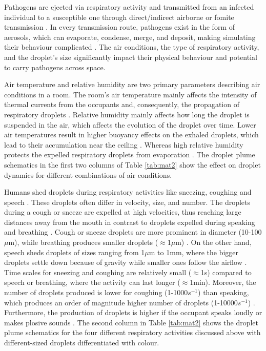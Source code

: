 \documentclass[a4paper,12pt]{elsarticle}
\begin{document}
Pathogens are ejected via respiratory activity and transmitted from an infected individual to a susceptible one through direct/indirect airborne or fomite transmission \cite{leung2021transmissibility}. In every transmission route, pathogens exist in the form of aerosols, which can evaporate, condense, merge, and deposit, making simulating their behaviour complicated \cite{rosti2020fluid,zhou2021dynamical}. The air conditions, the type of respiratory activity, and the droplet's size significantly impact their physical behaviour and potential to carry pathogens across space.

Air temperature and relative humidity are two primary parameters describing air conditions in a room. The room's air temperature mainly affects the intensity of thermal currents from the occupants and, consequently, the propagation of respiratory droplets \cite{feng2020study}. Relative humidity mainly affects how long the droplet is suspended in the air, which affects the evolution of the droplet over time. Lower air temperatures result in higher buoyancy effects on the exhaled droplets, which lead to their accumulation near the ceiling \cite{zhang2019distribution}. Whereas high relative humidity protects the expelled respiratory droplets from evaporation \cite{chong2021extended}. The droplet plume schematics in the first two columns of Table \ref{tab:mat2} show the effect on droplet dynamics for different combinations of air conditions.

Humans shed droplets during respiratory activities like sneezing, coughing and speech \cite{stadnytskyi2021breathing}. These droplets often differ in velocity, size, and number. The droplets during a cough or sneeze are expelled at high velocities, thus reaching large distances away from the mouth in contrast to droplets expelled during speaking and breathing \cite{pendar2020numerical,zhang2019distribution}. Cough or sneeze droplets are more prominent in diameter (10-100 $\mu$m), while breathing produces smaller droplets ($\approx$1$\mu$m) \cite{shao2021risk}. On the other hand, speech sheds droplets of sizes ranging from 1$\mu$m to 1mm, where the bigger droplets settle down because of gravity while smaller ones follow the airflow \cite{tan2021experimental}. Time scales for sneezing and coughing are relatively small ($\approx$1s) compared to speech or breathing, where the activity can last longer ($\approx$1min). Moreover, the number of droplets produced is lower for coughing (1-1000$s^{-1}$) than speaking, which produces an order of magnitude higher number of droplets (1-10000$s^{-1}$) \cite{giri2022colliding}. Furthermore, the production of droplets is higher if the occupant speaks loudly or makes plosive sounds \cite{abkarian2020speech}. The second column in Table \ref{tab:mat2} shows the droplet plume schematics for the four different respiratory activities discussed above with different-sized droplets differentiated with colour.
\end{document}

